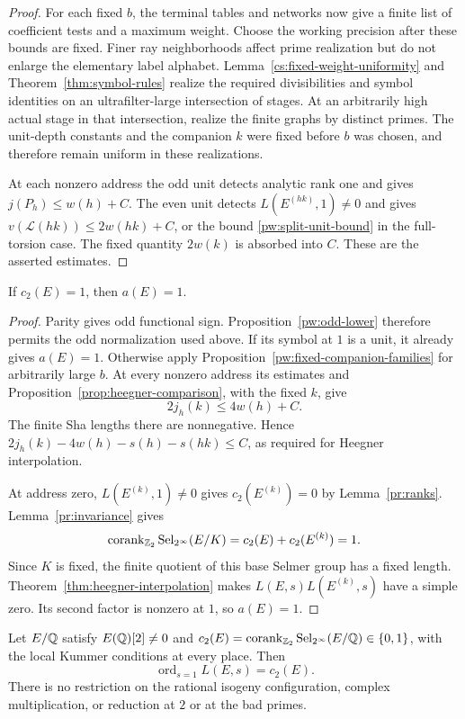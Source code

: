 \begin{proof}
For each fixed $b$, the terminal tables and networks now give a finite
list of coefficient tests and a maximum weight. Choose the working
precision after these bounds are fixed. Finer ray neighborhoods affect
prime realization but do not enlarge the elementary label alphabet.
Lemma~\ref{cs:fixed-weight-uniformity} and
Theorem~\ref{thm:symbol-rules} realize the required divisibilities and
symbol identities on an ultrafilter-large intersection of stages.
At an arbitrarily high actual stage in that intersection, realize the
finite graphs by distinct primes. The unit-depth constants and the
companion $k$ were fixed before $b$ was chosen, and therefore remain
uniform in these realizations.

At each nonzero address the odd unit detects analytic rank one and gives
$j(P_h)\le w(h)+C$. The even unit detects $L(E^{(hk)},1)\ne0$ and gives
$v(\mathcal L(hk))\le2w(hk)+C$, or the bound
\eqref{pw:split-unit-bound} in the full-torsion case. The fixed quantity
$2w(k)$ is absorbed into $C$. These are the asserted estimates.
\end{proof}

\begin{proposition}\label{pw:odd-base}
If $c_2(E)=1$, then $a(E)=1$.
\end{proposition}

\begin{proof}
Parity gives odd functional sign. Proposition~\ref{pw:odd-lower}
therefore permits the odd normalization used above. If its symbol at $1$
is a unit, it already gives $a(E)=1$. Otherwise apply
Proposition~\ref{pw:fixed-companion-families} for arbitrarily large $b$.
At every nonzero address its estimates and
Proposition~\ref{prop:heegner-comparison}, with the fixed $k$, give
\[
 2j_h(k)\le4w(h)+C.
\]
The finite Sha lengths there are nonnegative. Hence
$2j_h(k)-4w(h)-s(h)-s(hk)\le C$, as required for Heegner interpolation.

At address zero, $L(E^{(k)},1)\ne0$ gives $c_2(E^{(k)})=0$ by
Lemma~\ref{pr:ranks}. Lemma~\ref{pr:invariance} gives
\[
 \operatorname{corank}_{\mathbb Z_2}\operatorname{Sel}_{2^\infty}(E/K)
 =c_2(E)+c_2(E^{(k)})=1.
\]
Since $K$ is fixed, the finite quotient of this base Selmer group has a
fixed length. Theorem~\ref{thm:heegner-interpolation} makes
$L(E,s)L(E^{(k)},s)$ have a simple zero. Its second factor is nonzero at
$1$, so $a(E)=1$.
\end{proof}

\begin{theorem}\label{thm:rational-converse}
Let $E/\mathbb Q$ satisfy $E(\mathbb Q)[2]\ne0$ and
$c_2(E)=\operatorname{corank}_{\mathbb Z_2}\operatorname{Sel}_{2^\infty}(E/\mathbb Q)\in\{0,1\}$,
with the local Kummer conditions at every place.  Then
\[
                 \operatorname{ord}_{s=1}L(E,s)=c_2(E).
\]
There is no restriction on the rational isogeny configuration, complex
multiplication, or reduction at $2$ or at the bad primes.
\end{theorem}

